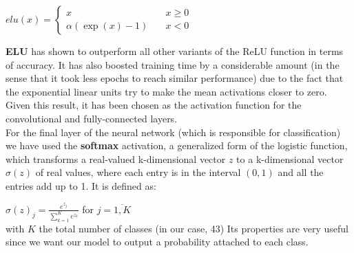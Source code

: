 \begin{center}
$elu(x)=
	\begin{cases}
		x &\quad x \geq 0\\
		\alpha(\exp(x)-1) &\quad x < 0
	\end{cases}
$
\end{center}
\textbf{ELU} has shown to outperform all other variants of the ReLU function in terms of accuracy. It has also boosted training time by a considerable amount (in the sense that it took less epochs to reach similar performance) due to the fact that the exponential linear units try to make the mean activations closer to zero. Given this result, it has been chosen as the activation function for the convolutional and fully-connected layers.\\

For the final layer of the neural network (which is responsible for classification) we have used the \textbf{softmax} activation,  a generalized form of the logistic function, which transforms a real-valued k-dimensional vector $z$ to a k-dimensional vector $\sigma (z)$ of real values, where each entry is in the interval $(0,1)$ and all the entries add up to 1. It is defined as:
\begin{center}
$\sigma (z)_j = \frac{e^{z_j}}{\sum_{k=1}^K e^{z_k}} $ for $ j = \overline{1,K}$\\
with $K$ the total number of classes (in our case, 43)
Its properties are very useful since we want our model to output a probability attached to each class.
\end{center}
